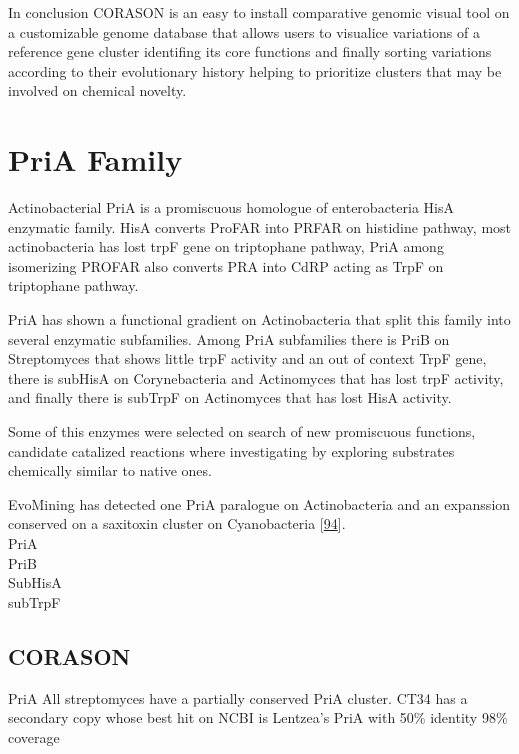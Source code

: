 \documentclass[12pt,twoside]{reedthesis}
\begin{document}
  In conclusion CORASON is an easy to install comparative genomic visual
  tool on a customizable genome database that allows users to visualice
  variations of a reference gene cluster identifing its core functions and
  finally sorting variations according to their evolutionary history
  helping to prioritize clusters that may be involved on chemical novelty.
  
  \chapter{PriA Family}\label{math-sci}
  
  Actinobacterial PriA is a promiscuous homologue of enterobacteria HisA
  enzymatic family. HisA converts ProFAR into PRFAR on histidine pathway,
  most actinobacteria has lost trpF gene on triptophane pathway, PriA
  among isomerizing PROFAR also converts PRA into CdRP acting as TrpF on
  triptophane pathway.
  
  PriA has shown a functional gradient on Actinobacteria that split this
  family into several enzymatic subfamilies. Among PriA subfamilies there
  is PriB on Streptomyces that shows little trpF activity and an out of
  context TrpF gene, there is subHisA on Corynebacteria and Actinomyces
  that has lost trpF activity, and finally there is subTrpF on Actinomyces
  that has lost HisA activity.
  
  Some of this enzymes were selected on search of new promiscuous
  functions, candidate catalized reactions where investigating by
  exploring substrates chemically similar to native ones.
  
  EvoMining has detected one PriA paralogue on Actinobacteria and an
  expanssion conserved on a saxitoxin cluster on Cyanobacteria
  {[}\protect\hyperlink{ref-moustafaux5foriginux5f2009}{94}{]}.\\
  PriA\\
  PriB\\
  SubHisA\\
  subTrpF\\
  \clearpage   
  
  \section{CORASON}\label{corason}
  
  PriA All streptomyces have a partially conserved PriA cluster. CT34 has
  a secondary copy whose best hit on NCBI is Lentzea's PriA with 50\%
  identity 98\% coverage
  
\end{document}
